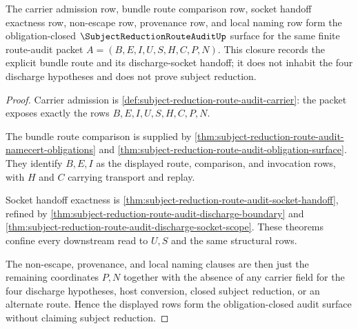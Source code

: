 \begin{theorem}
\label{thm:subject-reduction-route-audit-obligation-closure}
The carrier admission row, bundle route comparison row, socket handoff exactness row, non-escape row, provenance row, and local naming row form the obligation-closed $\SubjectReductionRouteAuditUp$ surface for the same finite route-audit packet $A=(B,E,I,U,S,H,C,P,N)$. This closure records the explicit bundle route and its discharge-socket handoff; it does not inhabit the four discharge hypotheses and does not prove subject reduction.
\end{theorem}
\begin{proof}
Carrier admission is \autoref{def:subject-reduction-route-audit-carrier}: the packet exposes exactly the rows $B,E,I,U,S,H,C,P,N$.

The bundle route comparison is supplied by \autoref{thm:subject-reduction-route-audit-namecert-obligations} and \autoref{thm:subject-reduction-route-audit-obligation-surface}. They identify $B,E,I$ as the displayed route, comparison, and invocation rows, with $H$ and $C$ carrying transport and replay.

Socket handoff exactness is \autoref{thm:subject-reduction-route-audit-socket-handoff}, refined by \autoref{thm:subject-reduction-route-audit-discharge-boundary} and \autoref{thm:subject-reduction-route-audit-discharge-socket-scope}. These theorems confine every downstream read to $U,S$ and the same structural rows.

The non-escape, provenance, and local naming clauses are then just the remaining coordinates $P,N$ together with the absence of any carrier field for the four discharge hypotheses, host conversion, closed subject reduction, or an alternate route. Hence the displayed rows form the obligation-closed audit surface without claiming subject reduction.
\end{proof}


